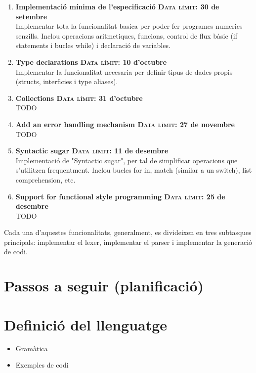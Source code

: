\documentclass{article}
\begin{document}
\begin{enumerate}
    \item \textbf{Implementació mínima de l'especificació \null\hfill \textsc{Data límit:} 30 de setembre}\\
        Implementar tota la funcionalitat basica per poder fer programes 
        numerics senzills. Inclou operacions aritmetiques, funcions, control de 
        flux bàsic (if statements i bucles while) i declaració de variables.

    \item \textbf{Type declarations \null\hfill \textsc{Data límit:} 10 d'octubre}\\
        Implementar la funcionalitat necesaria per definir tipus de dades 
        propis (structs, interficies i type aliases).

    \item \textbf{Collections \null\hfill \textsc{Data límit:} 31 d'octubre}\\
        TODO
    
    \item \textbf{Add an error handling mechanism \null\hfill \textsc{Data límit:} 27 de novembre}\\
        TODO
    
    \item \textbf{Syntactic sugar \null\hfill \textsc{Data límit:} 11 de desembre}\\
        Implementació de "Syntactic sugar", per tal de simplificar operacions 
        que s'utilitzen frequentment. Inclou bucles for in, match (similar a un
        switch), list comprehension, etc.
    
    \item \textbf{Support for functional style programming \null\hfill \textsc{Data límit:} 25 de desembre}\\
        TODO
\end{enumerate}

Cada una d'aquestes funcionalitats, generalment, es divideixen en tres 
subtasques principals: implementar el lexer, implementar el parser i 
implementar la generació de codi.

\section{Passos a seguir (planificació)}

\section{Definició del llenguatge}
\begin{itemize}
    \item Gramàtica
    \item Exemples de codi
\end{itemize}
\end{document}
